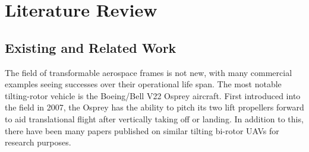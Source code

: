 \section{Literature Review}
\label{sec:intro.litreview}
\subsection{Existing and Related Work}
\label{subsec:intro.lit.related}
The field of transformable aerospace frames is not new, with many commercial examples seeing successes over their operational life span. The most notable tilting-rotor vehicle is the Boeing/Bell V22 Osprey\cite{osprey} aircraft. First introduced into the field in 2007, the Osprey has the ability to pitch its two lift propellers forward to aid translational flight after vertically taking off or landing. In addition to this, there have been many papers published on similar tilting bi-rotor UAVs for research purposes.
